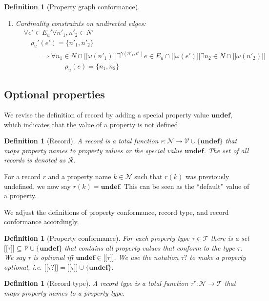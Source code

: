 \documentclass[a4paper]{article}
\newtheorem{definition}[theorem]{Definition}
\newcommand{\ptype}{\tau}
\newcommand{\ptypes}{\mathcal{T}}
\newcommand{\rtype}{\tau^r}
\newcommand{\lsem}{\ensuremath{[\![}}
\newcommand{\rsem}{\ensuremath{]\!]}}
\newcommand{\sem}[1]{\ensuremath{\lsem #1 \rsem}}
\newcommand{\undefined}{\mathbf{undef}}
\begin{document}
\begin{definition}[Property graph conformance]
\begin{enumerate}
    \item Cardinality constraints on undirected edges:
    \begin{align*}
      &\forall e' \in E_u' \forall n'_1, n'_2 \in N'\\
      &\quad\rho_u'(e') = \{n'_1, n'_2\}\\
      &\quad\quad\implies {} \forall n_1 \in N \cap \sem{\omega(n'_1)} \exists^{\gamma(n'_1, e')} e \in E_u \cap \sem{\omega(e')} \exists n_2 \in N \cap \sem{\omega(n'_2)}\\
      &\quad\quad\quad\quad\quad\quad\rho_u(e) = \{n_1, n_2\}
    \end{align*}
  \end{enumerate}
\end{definition}

\subsection{Optional properties}

We revise the definition of record by adding a special property value $\undefined$, which indicates that the value of a property is not defined.

\begin{definition}[Record]
  A \emph{record} is a total function $r : \mathcal{N} \to \mathcal{V} \cup \{\undefined\}$ that maps property names to property values or the special value $\undefined$. The set of all records is denoted as $\mathcal{R}$.
\end{definition}

For a record $r$ and a property name $k \in \mathcal{N}$ such that $r(k)$ was previously undefined, we now say $r(k) = \undefined$. This can be seen as the ``default'' value of a property.

We adjust the definitions of property conformance, record type, and record conformance accordingly.

\begin{definition}[Property conformance]
  For each property type $\ptype \in \ptypes$ there is a set $\sem{\ptype} \subseteq \mathcal{V} \cup \{\undefined\}$ that contains all property values that \emph{conform} to the type $\ptype$. We say $\ptype$ is \emph{optional} iff $\undefined \in \sem{\ptype}$. We use the notation $\ptype?$ to make a property optional, i.e. $\sem{\ptype?} = \sem{\ptype} \cup \{ \undefined \}$.
\end{definition}

\begin{definition}[Record type]
  A \emph{record type} is a total function $\rtype : \mathcal{N} \to \ptypes$ that maps property names to a property type.
\end{definition}
\end{document}
